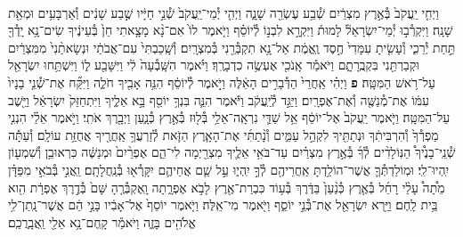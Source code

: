 \documentclass[twoside, openany, parskip=half, 11pt]{book}
\begin{document}
\begin{footnotesize}
\begin{multicols}{2}
\\
וַיְחִ֤י יַֽעֲקֹב֙ בְּ֯אֶ֣רֶץ מִצְרַ֔יִם שְׁ֯בַ֥ע עֶשְׂרֵ֖ה שָׁנָ֑ה וַיְהִ֤י יְ֯מֵי־יַֽעֲקֹב֙ שְׁ֯נֵ֣י חַיָּ֔יו שֶׁ֣בַע שָׁנִ֔ים וְ֯אַרְבָּעִ֥ים וּמְאַ֖ת שָׁנָֽה׃ וַיִּקְרְ֯ב֣וּ יְ֯מֵי־יִשְׂרָאֵל֘ לָמוּת֒ וַיִּקְרָ֣א לִבְנ֣וֹ לְ֯יוֹסֵ֗ף וַיֹּ֤אמֶר לוֹ֙ אִם־נָ֨א מָצָ֤אתִי חֵן֙ בְּ֯עֵינֶ֔יךָ שִׂים־נָ֥א יָֽדְ֯ךָ֖ תַּ֣חַת יְ֯רֵכִ֑י וְ֯עָשִׂ֤יתָ עִמָּדִי֙ חֶ֣סֶד וֶֽאֱמֶ֔ת אַל־נָ֥א תִקְבְּ֯רֵ֖נִי בְּ֯מִצְרָֽיִם׃ וְ֯שָֽׁכַבְתִּי֙ עִם־אֲבֹתַ֔י וּנְשָׂאתַ֨נִי֙ מִמִּצְרַ֔יִם וּקְבַרְתַּ֖נִי בִּקְבֻֽרָתָ֑ם וַיֹּאמַ֕ר אָֽנֹכִ֖י אֶעְשֶׂ֥ה כִדְבָרֶֽךָ׃ וַיֹּ֗אמֶר הִשָּֽׁבְ֯עָה֙ לִ֔י וַיִּשָּׁבַ֖ע ל֑וֹ וַיִּשְׁתַּ֥חוּ יִשְׂרָאֵ֖ל עַל־רֹ֥אשׁ הַמִּטָּֽה׃ \textbf{פ}
וַיְהִ֗י אַֽחֲרֵי֙ הַדְּ֯בָרִ֣ים הָאֵ֔לֶּה וַיֹּ֣אמֶר לְ֯יוֹסֵ֔ף הִנֵּ֥ה אָבִ֖יךָ חֹלֶ֑ה וַיִּקַּ֞ח אֶת־שְׁ֯נֵ֤י בָנָיו֙ עִמּ֔וֹ אֶת־מְ֯נַשֶּׁ֖ה וְ֯אֶת־אֶפְרָֽיִם׃ וַיַּגֵּ֣ד לְ֯יַֽעֲקֹ֔ב וַיֹּ֕אמֶר הִנֵּ֛ה בִּנְךָ֥ יוֹסֵ֖ף בָּ֣א אֵלֶ֑יךָ וַיִּתְחַזֵּק֙ יִשְׂרָאֵ֔ל וַיֵּ֖שֶׁב עַל־הַמִּטָּֽה׃ וַיֹּ֤אמֶר יַֽעֲקֹב֙ אֶל־יוֹסֵ֔ף אֵ֥ל שַׁדַּ֛י נִרְאָֽה־אֵלַ֥י בְּ֯ל֖וּז בְּ֯אֶ֣רֶץ כְּ֯נָ֑עַן וַיְבָ֖רֶךְ אֹתִֽי׃  וַיֹּ֣אמֶר אֵלַ֗י הִנְנִ֤י מַפְרְ֯ךָ֙ וְ֯הִרְבִּיתִ֔ךָ וּנְתַתִּ֖יךָ לִקְהַ֣ל עַמִּ֑ים וְ֯נָ֨תַתִּ֜י אֶת־הָאָ֧רֶץ הַזֹּ֛את לְ֯זַרְעֲךָ֥ אַֽחֲרֶ֖יךָ אֲחֻזַּ֥ת עוֹלָֽם׃ וְ֯עַתָּ֡ה שְׁ֯נֵֽי־בָנֶ֩יךָ֩ הַנּֽוֹלָדִ֨ים לְ֯ךָ֜ בְּ֯אֶ֣רֶץ מִצְרַ֗יִם עַד־בֹּאִ֥י אֵלֶ֛יךָ מִצְרַ֖יְמָה לִי־הֵ֑ם אֶפְרַ֨יִם֙ וּמְנַשֶּׁ֔ה כִּרְאוּבֵ֥ן וְ֯שִׁמְע֖וֹן יִֽהְיוּ־לִֽי׃ וּמֽוֹלַדְתְּ֯ךָ֛ אֲשֶׁר־הוֹלַ֥דְתָּ אַֽחֲרֵיהֶ֖ם לְ֯ךָ֣ יִֽהְי֑וּ עַ֣ל שֵׁ֧ם אֲחֵיהֶ֛ם יִקָּֽרְ֯א֖וּ בְּ֯נַֽחֲלָתָֽם׃ וַֽאֲנִ֣י בְּ֯בֹאִ֣י מִפַּדָּ֗ן מֵ֩תָה֩ עָלַ֨י רָחֵ֜ל בְּ֯אֶ֤רֶץ כְּ֯נַ֨עַן֙ בַּדֶּ֔רֶךְ בְּ֯ע֥וֹד כִּבְרַת־אֶ֖רֶץ לָבֹ֣א אֶפְרָ֑תָה וָֽאֶקְבְּ֯רֶ֤הָ שָּׁם֙ בְּ֯דֶ֣רֶךְ אֶפְרָ֔ת הִ֖וא בֵּ֥ית לָֽחֶם׃ וַיַּ֥רְא יִשְׂרָאֵ֖ל אֶת־בְּ֯נֵ֣י יוֹסֵ֑ף וַיֹּ֖אמֶר מִי־אֵֽלֶּה׃ וַיֹּ֤אמֶר יוֹסֵף֙ אֶל־אָבִ֔יו בָּנַ֣י הֵ֔ם אֲשֶׁר־נָֽתַן־לִ֥י אֱלֹהִ֖ים בָּזֶ֑ה וַיֹּאמַ֕ר קָֽחֶם־נָ֥א אֵלַ֖י וַֽאֲבָֽרֲכֵֽם׃


\end{multicols}
\end{footnotesize}
\end{document}
